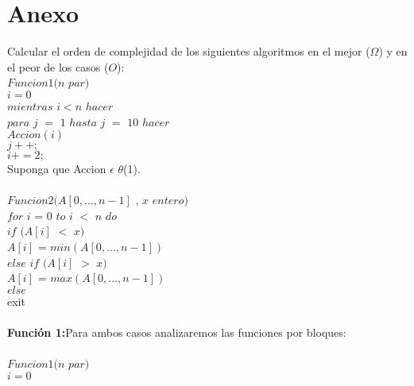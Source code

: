 \documentclass[12pt,twoside]{article}
\begin{document}
\section{Anexo}
Calcular el orden de complejidad de los siguientes algoritmos en el mejor ($\Omega$) y en el peor
de los casos ($O$):\\
\hspace*{1cm}$Funcion1(n$ $par)$\\
\hspace*{2cm}$i = 0$\\
\hspace*{2cm}$mientras$ $i < n$ $hacer$\\
\hspace*{3cm}$para$ $j$ $=$ $1$ $hasta$ $j$ $=$ $10$ $hacer$\\
\hspace*{3cm}$Accion(i)$\\
\hspace*{3cm}$j++;$\\
\hspace*{2cm}$i+=2;$\\
Suponga que Accion $\epsilon$ $\theta$(1).\\\\
\hspace*{1cm}$Funcion2(A[0,...,n-1]$ , $x$ $entero)$\\
\hspace*{2cm}$for$ $i$ = $0$ $to$ $i$ $<$ $n$ $do$\\
\hspace*{3cm}$if$ $(A[i]$ $<$ $x)$\\
\hspace*{4cm}$A[i]$ = $min(A[0,...,n-1])$\\
\hspace*{3cm}$else$ $if$ $(A[i]$ $>$ $x)$\\
\hspace*{4cm}$A[i]$ = $max(A[0,...,n-1])$\\
\hspace*{3cm}$else$\\
\hspace*{4cm}exit\\\\
\textbf{Funci\'on 1:}Para ambos casos analizaremos las funciones por bloques:\\\\
\hspace*{1cm}$Funcion1(n$ $par)$\\
\hspace*{2cm}$i = 0$\\
\end{document}
